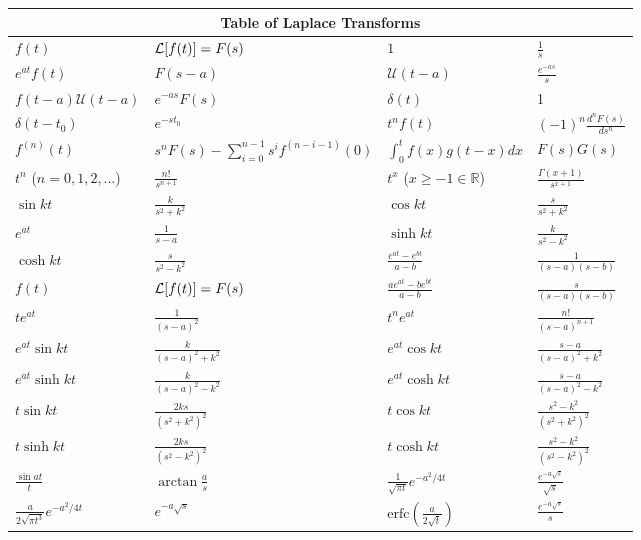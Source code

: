 \documentclass[main.tex]{subfiles}
\begin{document}
\tiny
\pagestyle{empty}


\begin{tabular}{ll|ll}
  \toprule
\multicolumn{4}{c}{Table of Laplace Transforms}
\\\midrule

$f(t)$ & $\mathcal{L}{\left[f(t)\right]}=F(s)$ 
	& $1$       			 & $\frac{1}{s}$            \\
$e^{at}f(t)$	& $F(s-a)$	 \
	& $\mathcal{U}(t-a)$ & $\frac{e^{-as}}{s}$  \\
$f(t-a)\mathcal{U}(t-a)$ & $e^{-as}F(s)$  
	& $\delta(t)$	& 1 \\
$\delta(t-t_0)$ & $e^{-st_0}$  
	& $t^nf(t)$ 	& $(-1)^n\frac{d^nF(s)}{ds^n}$   \\
$f^{(n)}(t)$ 	& $s^nF(s) - \sum_{i=0}^{n-1} s^if^{(n-i-1)}(0) $
	& $\displaystyle{\int_0^t f(x)g(t-x)dx}$ & $F(s)G(s)$  \\
$t^n$ ($n=0,1,2,\dots$)     & $\frac{n!}{s^{n+1}}$     
	& $t^x$ ($x\geq-1\in\mathbb{R}$)     & $\frac{\Gamma(x+1)}{s^{x+1}}$ \\
$\sin kt$ 	& $\frac{k}{s^2+k^2}$  
	& $\cos kt$ 	& $\frac{s}{s^2+k^2}$  \\
$e^{at}$ 	& $\frac{1}{s-a}$ 	 
	& $\sinh kt$	& $\frac{k}{s^2-k^2}$  \\
$\cosh kt$	& $\frac{s}{s^2-k^2}$  
	& $\frac{e^{at}-e^{bt}}{a-b}$	& $\frac{1}{(s-a)(s-b)}$ \\ 
$f(t)$ & $\mathcal{L}{\left[f(t)\right]}=F(s)$ 
	& $\frac{ae^{at}-be^{bt}}{a-b}$	& $\frac{s}{(s-a)(s-b)}$ \\ 
$te^{at}$	& $\frac{1}{(s-a)^2}$	 
	& $t^ne^{at}$	& $\frac{n!}{(s-a)^{n+1}}$	 \\
$e^{at}\sin kt$	& $\frac{k}{(s-a)^2+k^2}$   
	& $e^{at}\cos kt$	& $\frac{s-a}{(s-a)^2+k^2}$   \\
$e^{at}\sinh kt$	& $\frac{k}{(s-a)^2-k^2}$   
	& $e^{at}\cosh kt$	& $\frac{s-a}{(s-a)^2-k^2}$   \\
$t\sin kt$  	& $\frac{2ks}{(s^2+k^2)^2}$  
	& $t\cos kt$  	& $\frac{s^2-k^2}{(s^2+k^2)^2}$  \\
$t\sinh kt$  	& $\frac{2ks}{(s^2-k^2)^2}$  
	& $t\cosh kt$  	& $\frac{s^2-k^2}{(s^2-k^2)^2}$  \\
$\frac{\sin at}{t}$	& $\arctan \frac{a}{s}$  
	& $\frac{1}{\sqrt{\pi t}}e^{-a^2/4t}$	& $\frac{e^{-a\sqrt{s}}}{\sqrt{s}}$ \\
$\frac{a}{2\sqrt{\pi t^3}}e^{-a^2/4t}$	& $e^{-a\sqrt{s}}$ 
	& $\text{erfc}\left(\frac{a}{2\sqrt{t}}\right)$ &  $\frac{e^{-a\sqrt{s}}}{s}$ \\

\bottomrule
\end{tabular}

\renewcommand{\arraystretch}{1}
\end{document}
